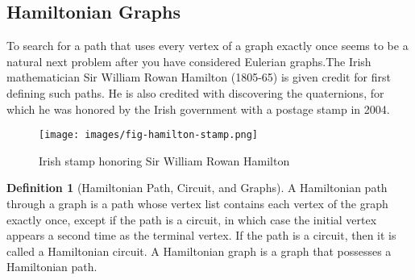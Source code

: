 \documentclass[10pt,]{book}
\theoremstyle{plain}
\theoremstyle{definition}
\newtheorem{definition}[theorem]{Definition}
\theoremstyle{definition}
\theoremstyle{definition}
\theoremstyle{definition}
\theoremstyle{definition}
\numberwithin{equation}{section}
\begin{document}
\subsection[Hamiltonian Graphs]{Hamiltonian Graphs}\label{ss-hamiltonian-graphs}
To search for a path that uses every vertex of a graph exactly once seems to be a natural next problem after you have considered Eulerian graphs.The Irish mathematician Sir William Rowan Hamilton (1805-65) is given credit for first defining such paths. He is also credited with discovering the quaternions, for which he was honored by the Irish government with a postage stamp in 2004.%
\leavevmode%
\begin{figure}
\centering
\texttt{[image: images/fig-hamilton-stamp.png]}
\caption{Irish stamp honoring Sir William Rowan Hamilton
                \label{fig-hamilton-stamp}}
\end{figure}
\begin{definition}[Hamiltonian Path, Circuit, and Graphs]\label{def-hamiltonian-path-circuit-graph}
A Hamiltonian path through a graph is a path whose vertex list contains each vertex of the graph exactly once, except if the path is a circuit, in which case the initial vertex appears a second time as the terminal vertex. If the path is a circuit, then it is called a Hamiltonian circuit. A Hamiltonian graph is a graph that possesses a Hamiltonian path.%
\end{definition}
\end{document}

